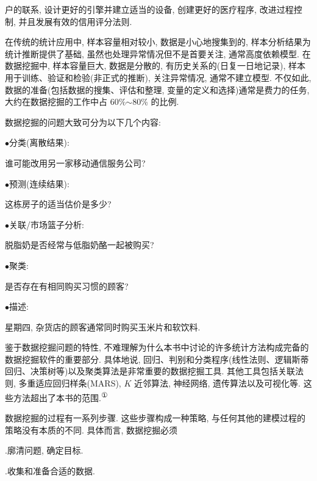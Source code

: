 
户的联系, 设计更好的引擎并建立适当的设备, 创建更好的医疗程序, 改进过程控制, 并且发展有效的信用评分法则.

在传统的统计应用中, 样本容量相对较小, 数据是小心地搜集到的, 样本分析结果为统计推断提供了基础, 虽然也处理异常情况但不是首要关注, 通常高度依赖模型. 在数据挖掘中, 样本容量巨大, 数据是分散的, 有历史关系的(日复一日地记录), 样本用于训练、验证和检验(非正式的推断), 关注异常情况, 通常不建立模型. 不仅如此, 数据的准备(包括数据的搜集、评估和整理, 变量的定义和选择)通常是费力的任务, 大约在数据挖掘的工作中占 60\%$\sim$80\% 的比例.

数据挖掘的问题大致可分为以下几个内容:

\noindent$\bullet$\quad 分类(离散结果):

\noindent\hspace*{1.5em}谁可能改用另一家移动通信服务公司?

\noindent$\bullet$\quad 预测(连续结果):

\noindent\hspace*{1.5em}这栋房子的适当估价是多少?

\noindent$\bullet$\quad 关联/市场篮子分析:

\noindent\hspace*{1.5em}脱脂奶是否经常与低脂奶酪一起被购买?

\noindent$\bullet$\quad 聚类:

\noindent\hspace*{1.5em}是否存在有相同购买习惯的顾客?

\noindent$\bullet$\quad 描述:

\noindent\hspace*{1.5em}星期四, 杂货店的顾客通常同时购买玉米片和软饮料.

鉴于数据挖掘问题的特性, 不难理解为什么本书中讨论的许多统计方法构成完备的数据挖掘软件的重要部分. 具体地说, 回归、判别和分类程序(线性法则、逻辑斯蒂回归、决策树等)以及聚类算法是非常重要的数据挖掘工具. 其他工具包括关联法则, 多重适应回归样条(MARS), $K$ 近邻算法, 神经网络, 遗传算法以及可视化等. 这些方法超出了本书的范围.\textsuperscript{①}


数据挖掘的过程有一系列步骤. 这些步骤构成一种策略, 与任何其他的建模过程的策略没有本质的不同. 具体而言, 数据挖掘必须

.\quad 廓清问题, 确定目标.

.\quad 收集和准备合适的数据.

